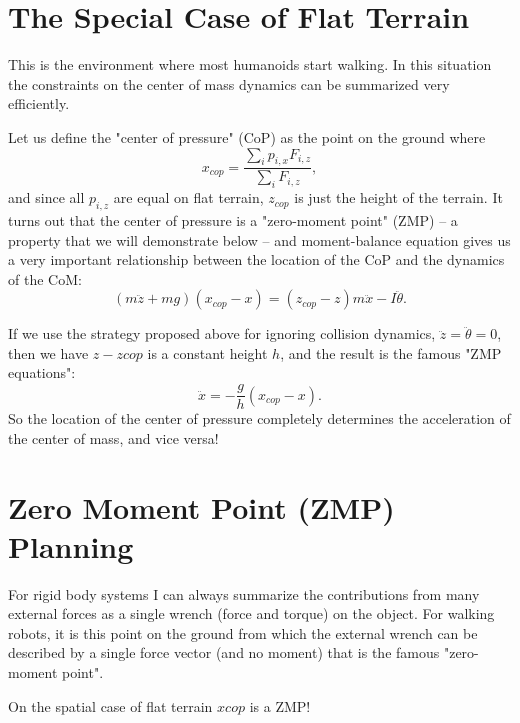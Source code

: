 \section{The Special Case of Flat Terrain}
This is the environment where most humanoids start walking. In this situation the constraints on the center of mass dynamics can be summarized very efficiently.

Let us define the "center of pressure" (CoP) as the point on the ground where 
$$x_{cop} = \frac{\sum_i p_{i,x} F_{i,z}}{\sum_i
    F_{i,z}},$$
and since all $p_{i,z}$ are equal on flat terrain, $z_{cop}$ is just the height of the terrain. It turns out that the center of pressure is a "zero-moment point" (ZMP) -- a property that we will demonstrate below -- and moment-balance equation gives us a very important relationship between the location of the CoP and the dynamics of the CoM: 
$$(m\ddot{z} + mg)
    (x_{cop} - x) = (z_{cop} - z) m\ddot{x} - I\ddot\theta.$$
    
If we use the strategy proposed above for ignoring collision dynamics, $\ddot{z}=\ddot{\theta}=0$, then we have $z-z{cop}$ is a constant height $h$, and the result is the famous "ZMP equations": 
$$\ddot{x} = -\frac{g}{h}
    (x_{cop}-x).$$
So the location of the center of pressure completely determines the acceleration of the center of mass, and vice versa!


\section{Zero Moment Point (ZMP) Planning}
For rigid body systems I can always summarize the contributions from many external forces as a single wrench (force and torque) on the object. For walking robots, it is this point on the ground from which the external wrench can be described by a single force vector (and no moment) that is the famous "zero-moment point".

On the spatial case of flat terrain $x{cop}$ is a ZMP!


